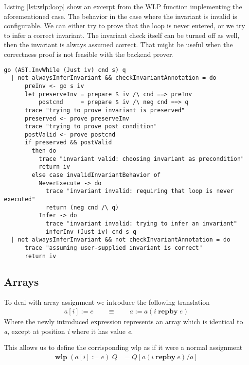\documentclass[]{scrartcl}
\newcommand{\WLP}[2]{\ensuremath{\mathbf{wlp}\;#1\;#2}}
\newcommand{\REPBY}[2]{\ensuremath{#1\;\mathbf{repby}\;#2}}
\begin{document}
Listing \ref{lst:wlp:loop} show an excerpt from the WLP function implementing the aforementioned case.
The behavior in the case where the invariant is invalid is configurable. We can either try to prove
that the loop is never entered, or we try to infer a correct invariant.
The invariant check itself can be turned off as well, then the invariant is always assumed correct.
That might be useful when the correctness proof is not feasible with the backend prover.

\begin{lstlisting}[caption=WLP loop case, label=lst:wlp:loop]
go (AST.InvWhile (Just iv) cnd s) q
  | not alwaysInferInvariant && checkInvariantAnnotation = do
      preInv <- go s iv
      let preserveInv = prepare $ iv /\ cnd ==> preInv
          postcnd     = prepare $ iv /\ neg cnd ==> q
      trace "trying to prove invariant is preserved"
      preserved <- prove preserveInv
      trace "trying to prove post condition"
      postValid <- prove postcnd
      if preserved && postValid
        then do
          trace "invariant valid: choosing invariant as precondition"
          return iv
        else case invalidInvariantBehavior of
          NeverExecute -> do
            trace "invariant invalid: requiring that loop is never executed"
            return (neg cnd /\ q)
          Infer -> do
            trace "invariant invalid: trying to infer an invariant"
            inferInv (Just iv) cnd s q
  | not alwaysInferInvariant && not checkInvariantAnnotation = do
      trace "assuming user-supplied invariant is correct"
      return iv
\end{lstlisting}


\subsection{Arrays}

To deal with array assignment we introduce the following translation
\begin{align}
  a[i] := e \qquad \equiv \qquad a := a ( \REPBY{i}{e} )
\end{align}
Where the newly introduced expression represents an array which is identical to
\emph{a}, except at position \emph{i} where it has value \emph{e}.

This allows us to define the corrisponding wlp as if it were a normal assignment
\begin{align}
  \WLP{(a[i] := e)}{Q} &= Q[a( \REPBY{i}{e} ) / a]
\end{align}
\end{document}
